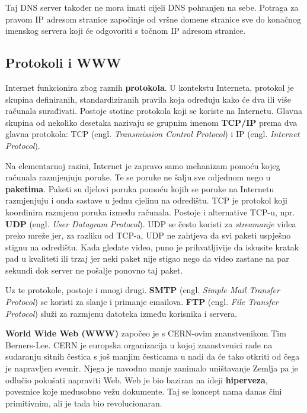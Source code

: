 Taj DNS server također ne mora imati cijeli DNS pohranjen na sebe.
Potraga za pravom IP adresom stranice započinje od vršne domene stranice sve do konačnog imenskog servera koji će odgovoriti s točnom IP adresom stranice.

\subsection{Protokoli i WWW}\label{subsec:protokoli-i-www}

Internet funkcionira zbog raznih \textbf{protokola}.
U kontekstu Interneta, protokol je skupina definiranih, standardiziranih pravila koja određuju kako će dva ili više računala surađivati.
Postoje stotine protokola koji se koriste na Internetu.
Glavna skupina od nekoliko desetaka nazivaju se grupnim imenom \textbf{TCP/IP} prema dva glavna protokola: TCP (engl. \textit{Transmission Control Protocol}) i IP (engl. \textit{Internet Protocol}).

Na elementarnoj razini, Internet je zapravo samo mehanizam pomoću kojeg računala razmjenjuju poruke.
Te se poruke ne šalju sve odjednom nego u \textbf{paketima}.
Paketi su djelovi poruka pomoću kojih se poruke na Internetu razmjenjuju i onda sastave u jednu cjelinu na odredištu.
TCP je protokol koji koordinira razmjenu poruka između računala.
Postoje i alternative TCP-u, npr. \textbf{UDP} (engl. \textit{User Datagram Protocol}).
UDP se često koristi za \textit{streamanje} videa preko mreže jer, za razliku od TCP-a, UDP ne zahtjeva da svi paketi uspješno stignu na odredištu.
Kada gledate video, puno je prihvatljivije da iskusite kratak pad u kvaliteti ili trzaj jer neki paket nije stigao nego da video zastane na par sekundi dok server ne pošalje ponovno taj paket.

Uz te protokole, postoje i mnogi drugi.
\textbf{SMTP} (engl. \textit{Simple Mail Transfer Protocol}) se koristi za slanje i primanje emailova.
\textbf{FTP} (engl. \textit{File Transfer Protocol}) služi za razmjenu datoteka između korisnika i servera.

\textbf{World Wide Web (WWW)} započeo je s CERN-ovim znanstvenikom Tim Berners-Lee.
CERN je europska organizacija u kojoj znanstvenici rade na sudaranju sitnih čestica s još manjim česticama u nadi da će tako otkriti od čega je napravljen svemir.
Njega je navodno manje zanimalo uništavanje Zemlja pa je odlučio pokušati napraviti Web.
Web je bio baziran na ideji \textbf{hiperveza}, poveznice koje međusobno vežu dokumente.
Taj se koncept nama danas čini primitivnim, ali je tada bio revolucionaran.

